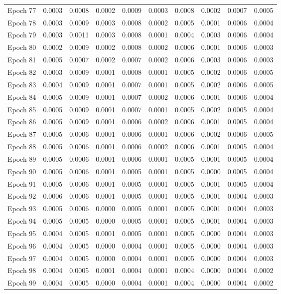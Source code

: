 \begin{table}[htbp]
\begin{tabular}{|l|l|l|l|l|l|l|l|l|l|}
Epoch 77 & 0.0003 & 0.0008 & 0.0002 & 0.0009 & 0.0003 & 0.0008 & 0.0002 & 0.0007 & 0.0005  \\
Epoch 78 & 0.0003 & 0.0009 & 0.0003 & 0.0008 & 0.0002 & 0.0005 & 0.0001 & 0.0006 & 0.0004  \\
Epoch 79 & 0.0003 & 0.0011 & 0.0003 & 0.0008 & 0.0001 & 0.0004 & 0.0003 & 0.0006 & 0.0004  \\
Epoch 80 & 0.0002 & 0.0009 & 0.0002 & 0.0008 & 0.0002 & 0.0006 & 0.0001 & 0.0006 & 0.0003  \\
Epoch 81 & 0.0005 & 0.0007 & 0.0002 & 0.0007 & 0.0002 & 0.0006 & 0.0003 & 0.0006 & 0.0003  \\
Epoch 82 & 0.0003 & 0.0009 & 0.0001 & 0.0008 & 0.0001 & 0.0005 & 0.0002 & 0.0006 & 0.0005  \\
Epoch 83 & 0.0004 & 0.0009 & 0.0001 & 0.0007 & 0.0001 & 0.0005 & 0.0002 & 0.0006 & 0.0005  \\
Epoch 84 & 0.0005 & 0.0009 & 0.0001 & 0.0007 & 0.0002 & 0.0006 & 0.0001 & 0.0006 & 0.0004  \\
Epoch 85 & 0.0005 & 0.0009 & 0.0001 & 0.0007 & 0.0001 & 0.0005 & 0.0002 & 0.0005 & 0.0004  \\
Epoch 86 & 0.0005 & 0.0009 & 0.0001 & 0.0006 & 0.0002 & 0.0006 & 0.0001 & 0.0005 & 0.0004  \\
Epoch 87 & 0.0005 & 0.0006 & 0.0001 & 0.0006 & 0.0001 & 0.0006 & 0.0002 & 0.0006 & 0.0005  \\
Epoch 88 & 0.0005 & 0.0006 & 0.0001 & 0.0006 & 0.0002 & 0.0006 & 0.0001 & 0.0005 & 0.0004  \\
Epoch 89 & 0.0005 & 0.0006 & 0.0001 & 0.0006 & 0.0001 & 0.0005 & 0.0001 & 0.0005 & 0.0004  \\
Epoch 90 & 0.0005 & 0.0006 & 0.0001 & 0.0005 & 0.0001 & 0.0005 & 0.0000 & 0.0005 & 0.0004  \\
Epoch 91 & 0.0005 & 0.0006 & 0.0001 & 0.0005 & 0.0001 & 0.0005 & 0.0001 & 0.0005 & 0.0004  \\
Epoch 92 & 0.0006 & 0.0006 & 0.0001 & 0.0005 & 0.0001 & 0.0005 & 0.0001 & 0.0004 & 0.0003  \\
Epoch 93 & 0.0005 & 0.0006 & 0.0000 & 0.0005 & 0.0001 & 0.0005 & 0.0001 & 0.0004 & 0.0003  \\
Epoch 94 & 0.0005 & 0.0005 & 0.0000 & 0.0005 & 0.0001 & 0.0005 & 0.0001 & 0.0004 & 0.0003  \\
Epoch 95 & 0.0004 & 0.0005 & 0.0001 & 0.0005 & 0.0001 & 0.0005 & 0.0000 & 0.0004 & 0.0003  \\
Epoch 96 & 0.0004 & 0.0005 & 0.0000 & 0.0004 & 0.0001 & 0.0005 & 0.0000 & 0.0004 & 0.0003  \\
Epoch 97 & 0.0004 & 0.0005 & 0.0000 & 0.0004 & 0.0001 & 0.0005 & 0.0000 & 0.0004 & 0.0003  \\
Epoch 98 & 0.0004 & 0.0005 & 0.0001 & 0.0004 & 0.0001 & 0.0004 & 0.0000 & 0.0004 & 0.0002  \\
Epoch 99 & 0.0004 & 0.0005 & 0.0000 & 0.0004 & 0.0001 & 0.0004 & 0.0000 & 0.0004 & 0.0002  \\
\hline
\end{tabular}
\end{table}